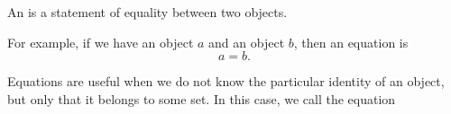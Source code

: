 


An  is
a statement of equality between
two objects.

For example, if we have an object $a$
and an object $b$, then an equation
is
\[
  a = b.
\]

Equations are useful when we do not
know the particular identity of an
object, but only that it belongs to
some set.
In this case, we call the
equation 
